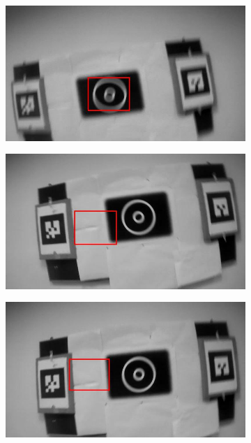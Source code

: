 \documentclass[runningheads]{llncs}
\begin{document}
\begin{figure}
\begin{subfigure}[b]{.19\textwidth}
\includegraphics[width=\linewidth]{BLUT_output_00/4.jpg}
\end{subfigure}
\begin{subfigure}[b]{.19\textwidth}
\includegraphics[width=\linewidth]{BLUT_output_00/5.jpg}
\end{subfigure}
\begin{subfigure}[b]{.19\textwidth}
\includegraphics[width=\linewidth]{BLUT_output_00/6.jpg}

\end{subfigure}
\end{figure}
\end{document}
